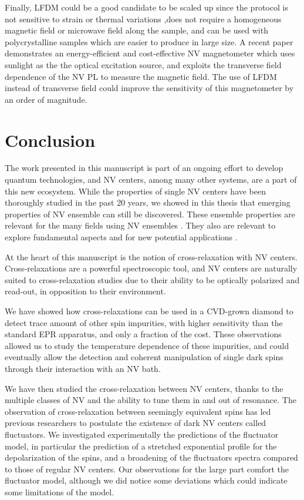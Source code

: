 \documentclass[a4paper, 11pt]{report}
\begin{document}
Finally, LFDM could be a good candidate to be scaled up since the protocol is not sensitive to strain or thermal variations ,does not require a homogeneous magnetic field or microwave field along the sample, and can be used with polycrystalline samples which are easier to produce in large size. A recent paper demonstrates an energy-efficient and cost-effective NV magnetometer which uses sunlight as the the optical excitation source, and exploits the transverse field dependence of the NV PL to measure the magnetic field\citep{zhu2022sunlight}. The use of LFDM instead of transverse field could improve the sensitivity of this magnetometer by an order of magnitude.



\chapter*{Conclusion}

The work presented in this manuscript is part of an ongoing effort to develop quantum technologies, and NV centers, among many other systems, are a part of this new ecosystem. While the properties of single NV centers have been thoroughly studied in the past 20 years, we showed in this thesis that emerging properties of NV ensemble can still be discovered. These ensemble properties are relevant for the many fields using NV ensembles \citep{ barry2020sensitivity, eills2022spin, fu2007characterization, perdriat2021spin}. They also are relevant to explore fundamental aspects \citep{choi2017observation, kucsko2018critical, angerer2018superradiant} and for new potential applications \citep{akhmedzhanov2017microwave, pellet2021optical, pellet2022spin}.

At the heart of this manuscript is the notion of cross-relaxation with NV centers. Cross-relaxations are a powerful spectroscopic tool, and NV centers are naturally suited to cross-relaxation studies due to their ability to be optically polarized and read-out, in opposition to their environment.

We have showed how cross-relaxations can be used in a CVD-grown diamond to detect trace amount of other spin impurities, with higher sensitivity than the standard EPR apparatus, and only a fraction of the cost. These observations allowed us to study the temperature dependence of these impurities, and could eventually allow the detection and coherent manipulation of single dark spins through their interaction with an NV bath.

We have then studied the cross-relaxation between NV centers, thanks to the multiple classes of NV and the ability to tune them in and out of resonance. The observation of cross-relaxation between seemingly equivalent spins has led previous researchers to postulate the existence of dark NV centers called fluctuators. We investigated experimentally the predictions of the fluctuator model, in particular the prediction of a stretched exponential profile for the depolarization of the spins, and a broadening of the fluctuators spectra compared to those of regular NV centers. Our observations for the large part comfort the fluctuator model, although we did notice some deviations which could indicate some limitations of the model. 
\end{document}
